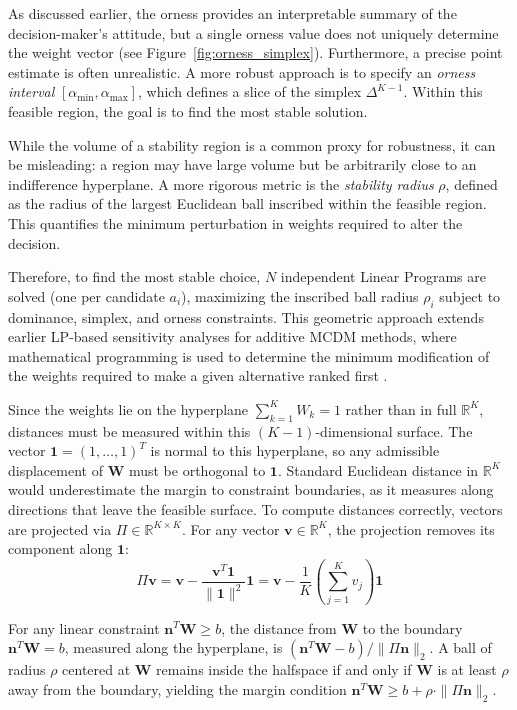As discussed earlier, the orness provides an interpretable summary of the decision-maker's attitude, but a single orness value does not uniquely determine the weight vector (see Figure~\ref{fig:orness_simplex}). Furthermore, a precise point estimate is often unrealistic. A more robust approach is to specify an \textit{orness interval} $[\alpha_{\min}, \alpha_{\max}]$, which defines a slice of the simplex $\Delta^{K-1}$. Within this feasible region, the goal is to find the most stable solution.

While the volume of a stability region is a common proxy for robustness, it can be misleading: a region may have large volume but be arbitrarily close to an indifference hyperplane. A more rigorous metric is the \textit{stability radius} $\rho$, defined as the radius of the largest Euclidean ball inscribed within the feasible region. This quantifies the minimum perturbation in weights required to alter the decision.

Therefore, to find the most stable choice, $N$ independent Linear Programs are solved (one per candidate $a_i$), maximizing the inscribed ball radius $\rho_i$ subject to dominance, simplex, and orness constraints. This geometric approach extends earlier LP-based sensitivity analyses for additive MCDM methods, where mathematical programming is used to determine the minimum modification of the weights required to make a given alternative ranked first \cite{wolters1995novel}. 

Since the weights lie on the hyperplane $\sum_{k=1}^K W_k = 1$ rather than in full $\mathbb{R}^K$, distances must be measured within this $(K-1)$-dimensional surface. The vector $\mathbf{1} = (1, \dots, 1)^T$ is normal to this hyperplane, so any admissible displacement of $\mathbf{W}$ must be orthogonal to $\mathbf{1}$. Standard Euclidean distance in $\mathbb{R}^K$ would underestimate the margin to constraint boundaries, as it measures along directions that leave the feasible surface. To compute distances correctly, vectors are projected via $\Pi \in \mathbb{R}^{K \times K}$. For any vector $\mathbf{v} \in \mathbb{R}^K$, the projection removes its component along $\mathbf{1}$:
\[
\Pi\mathbf{v} = \mathbf{v} - \frac{\mathbf{v}^T\mathbf{1}}{\|\mathbf{1}\|^2} \mathbf{1} = \mathbf{v} - \frac{1}{K}\left(\sum_{j=1}^K v_j\right) \mathbf{1}
\]

For any linear constraint $\mathbf{n}^T \mathbf{W} \ge b$, the distance from $\mathbf{W}$ to the boundary $\mathbf{n}^T \mathbf{W} = b$, measured along the hyperplane, is $(\mathbf{n}^T \mathbf{W} - b)/\|\Pi\mathbf{n}\|_2$. A ball of radius $\rho$ centered at $\mathbf{W}$ remains inside the halfspace if and only if $\mathbf{W}$ is at least $\rho$ away from the boundary, yielding the margin condition $\mathbf{n}^T \mathbf{W} \ge b + \rho \cdot \|\Pi\mathbf{n}\|_2$. 

